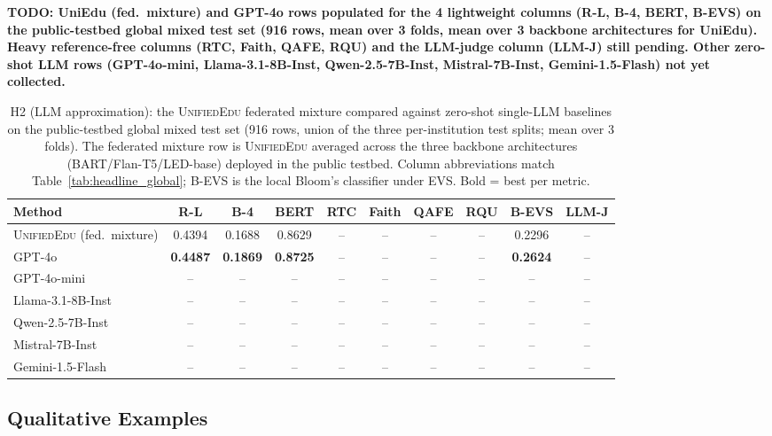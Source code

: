 \documentclass[11pt]{article}
\theoremstyle{plain}
\theoremstyle{definition}
\theoremstyle{remark}
\newcommand{\red}[1]{\textcolor{myred}{\textbf{#1}}}
\newcommand{\UniEdu}{\textsc{UnifiedEdu}}
\begin{document}
\red{TODO: UniEdu (fed.\ mixture) and GPT-4o rows populated for the 4 lightweight columns (R-L, B-4, BERT, B-EVS) on the public-testbed global mixed test set (916 rows, mean over 3 folds, mean over 3 backbone architectures for UniEdu). Heavy reference-free columns (RTC, Faith, QAFE, RQU) and the LLM-judge column (LLM-J) still pending. Other zero-shot LLM rows (GPT-4o-mini, Llama-3.1-8B-Inst, Qwen-2.5-7B-Inst, Mistral-7B-Inst, Gemini-1.5-Flash) not yet collected.}
\begin{table}[t]
\centering
\footnotesize
\setlength{\tabcolsep}{3pt}
\caption{H2 (LLM approximation): the \UniEdu{}
federated mixture compared against zero-shot
single-LLM baselines on the public-testbed
global mixed test set (916 rows, union of the three
per-institution test splits; mean over 3 folds). The
federated mixture row is \UniEdu{} averaged across
the three backbone architectures
(BART/Flan-T5/LED-base) deployed in the public
testbed. Column abbreviations match
Table~\ref{tab:headline_global}; B-EVS is the
local Bloom's classifier under EVS. Bold = best per metric.}
\label{tab:llm_approx}
\begin{tabular}{lccccccccc}
\toprule
\textbf{Method} &
\textbf{R-L} & \textbf{B-4} & \textbf{BERT} &
\textbf{RTC} & \textbf{Faith} & \textbf{QAFE} &
\textbf{RQU} & \textbf{B-EVS} & \textbf{LLM-J} \\
\midrule
\UniEdu{} (fed.\ mixture) & 0.4394 & 0.1688 & 0.8629 & -- & -- & -- & -- & 0.2296 & -- \\
\midrule
GPT-4o              & \textbf{0.4487} & \textbf{0.1869} & \textbf{0.8725} & -- & -- & -- & -- & \textbf{0.2624} & -- \\
GPT-4o-mini         & -- & -- & -- & -- & -- & -- & -- & -- & -- \\
Llama-3.1-8B-Inst   & -- & -- & -- & -- & -- & -- & -- & -- & -- \\
Qwen-2.5-7B-Inst    & -- & -- & -- & -- & -- & -- & -- & -- & -- \\
Mistral-7B-Inst     & -- & -- & -- & -- & -- & -- & -- & -- & -- \\
Gemini-1.5-Flash    & -- & -- & -- & -- & -- & -- & -- & -- & -- \\
\bottomrule
\end{tabular}
\end{table}

\subsection{Qualitative Examples}
\label{sec:results_qualitative}
\end{document}
